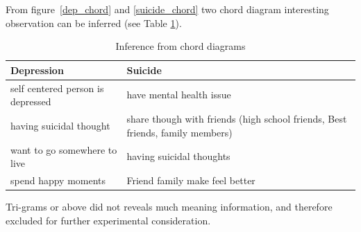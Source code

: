 \documentclass[sn-mathphys,Numbered]{sn-jnl}%
\theoremstyle{thmstyleone}%
\theoremstyle{thmstyletwo}%
\theoremstyle{thmstylethree}%
\begin{document}
From figure~\ref{dep_chord} and \ref{suicide_chord} two chord diagram interesting observation can be inferred (see Table \ref{chord_inference}). 
\begin{table}[h]
\begin{center}
\begin{flushleft}
\caption{Inference from chord diagrams}\label{chord_inference}%
\begin{tabular}{|l|p{6cm}|}
\toprule
\textbf{Depression} & \textbf{Suicide} \\
\midrule
self centered person is depressed & have mental health issue \\
having suicidal thought & share though with friends (high school friends, Best friends, family members) \\
want to go somewhere to live & having suicidal thoughts \\
spend happy moments & Friend family make feel better \\
\bottomrule
\end{tabular}
\end{flushleft}
\end{center}
\end{table}

Tri-grams or above did not reveals much meaning information, and therefore excluded for further experimental consideration. 
\end{document}
